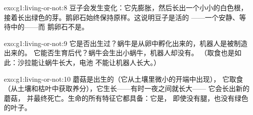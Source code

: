 \begin{solution}{exo:g1:living-or-not:8}
豆子会发生变化：它先膨胀，然后长出一个小小的白色根，
接着长出绿色的芽。鹅卵石始终保持原样。这说明豆子是活的
——一个安静、等待中的——而
鹅卵石不是。
\end{solution}

\begin{solution}{exo:g1:living-or-not:9}
它是否出生过？蜗牛是从卵中孵化出来的，机器人是被制造出来的。
它能否生育后代？蜗牛会生出小蜗牛，机器人却没有。
（取食也是如此：沙拉能让蜗牛长大，电池
不能让机器人长大。）
\end{solution}

\begin{solution}{exo:g1:living-or-not:10}
蘑菇是出生的（它从土壤里微小的开端中出现），
它取食（从土壤和枯叶中获取养分），它生长——有时一夜之间就长大——
它会长出新的蘑菇，
并最终死亡。生命的所有特征它都具备：它是，
即使没有腿，也没有绿色的叶子。
\end{solution}
